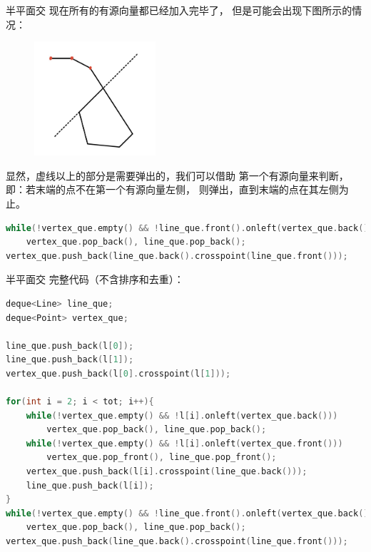 \documentclass{beamer}
\begin{document}
\begin{frame}[fragile]{半平面交}
    \footnotesize
    现在所有的有源向量都已经加入完毕了，
    但是可能会出现下图所示的情况：

    \begin{figure}[H]
        \centering
        \includegraphics[width=0.4\textwidth]{pic/halfplane_3.jpg}
    \end{figure}

    显然，虚线以上的部分是需要弹出的，我们可以借助
    第一个有源向量来判断，即：若末端的点不在第一个有源向量左侧，
    则弹出，直到末端的点在其左侧为止。

    \pause
    \begin{lstlisting}[language=c++]
while(!vertex_que.empty() && !line_que.front().onleft(vertex_que.back()))
    vertex_que.pop_back(), line_que.pop_back();
vertex_que.push_back(line_que.back().crosspoint(line_que.front()));
    \end{lstlisting}
\end{frame}

\begin{frame}[fragile]{半平面交}
    \footnotesize
    完整代码（不含排序和去重）：

    \begin{lstlisting}[language=c++]
deque<Line> line_que;
deque<Point> vertex_que;

line_que.push_back(l[0]);
line_que.push_back(l[1]);
vertex_que.push_back(l[0].crosspoint(l[1]));

for(int i = 2; i < tot; i++){
    while(!vertex_que.empty() && !l[i].onleft(vertex_que.back()))
        vertex_que.pop_back(), line_que.pop_back();
    while(!vertex_que.empty() && !l[i].onleft(vertex_que.front()))
        vertex_que.pop_front(), line_que.pop_front();
    vertex_que.push_back(l[i].crosspoint(line_que.back()));
    line_que.push_back(l[i]);
}
while(!vertex_que.empty() && !line_que.front().onleft(vertex_que.back()))
    vertex_que.pop_back(), line_que.pop_back();
vertex_que.push_back(line_que.back().crosspoint(line_que.front()));
    \end{lstlisting}
\end{frame}
\end{document}
